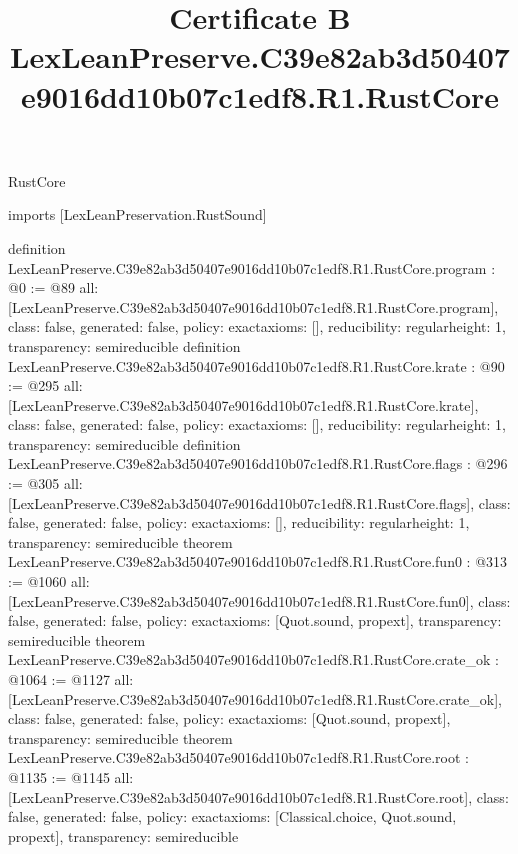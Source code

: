 \begin{lexlean}{RustCore}
\title{Certificate B LexLeanPreserve.C39e82ab3d50407e9016dd10b07c1edf8.R1.RustCore}
\begin{coremodule}
imports [LexLeanPreservation.RustSound]

definition LexLeanPreserve.C39e82ab3d50407e9016dd10b07c1edf8.R1.RustCore.program : @0 := @89 {
  all: [LexLeanPreserve.C39e82ab3d50407e9016dd10b07c1edf8.R1.RustCore.program],
  class: false,
  generated: false,
  policy: exact{axioms: []},
  reducibility: regular{height: 1},
  transparency: semireducible
}
definition LexLeanPreserve.C39e82ab3d50407e9016dd10b07c1edf8.R1.RustCore.krate : @90 := @295 {
  all: [LexLeanPreserve.C39e82ab3d50407e9016dd10b07c1edf8.R1.RustCore.krate],
  class: false,
  generated: false,
  policy: exact{axioms: []},
  reducibility: regular{height: 1},
  transparency: semireducible
}
definition LexLeanPreserve.C39e82ab3d50407e9016dd10b07c1edf8.R1.RustCore.flags : @296 := @305 {
  all: [LexLeanPreserve.C39e82ab3d50407e9016dd10b07c1edf8.R1.RustCore.flags],
  class: false,
  generated: false,
  policy: exact{axioms: []},
  reducibility: regular{height: 1},
  transparency: semireducible
}
theorem LexLeanPreserve.C39e82ab3d50407e9016dd10b07c1edf8.R1.RustCore.fun0 : @313 := @1060 {
  all: [LexLeanPreserve.C39e82ab3d50407e9016dd10b07c1edf8.R1.RustCore.fun0],
  class: false,
  generated: false,
  policy: exact{axioms: [Quot.sound, propext]},
  transparency: semireducible
}
theorem LexLeanPreserve.C39e82ab3d50407e9016dd10b07c1edf8.R1.RustCore.crate_ok : @1064 := @1127 {
  all: [LexLeanPreserve.C39e82ab3d50407e9016dd10b07c1edf8.R1.RustCore.crate_ok],
  class: false,
  generated: false,
  policy: exact{axioms: [Quot.sound, propext]},
  transparency: semireducible
}
theorem LexLeanPreserve.C39e82ab3d50407e9016dd10b07c1edf8.R1.RustCore.root : @1135 := @1145 {
  all: [LexLeanPreserve.C39e82ab3d50407e9016dd10b07c1edf8.R1.RustCore.root],
  class: false,
  generated: false,
  policy: exact{axioms: [Classical.choice, Quot.sound, propext]},
  transparency: semireducible
}


\end{coremodule}
\end{lexlean}
